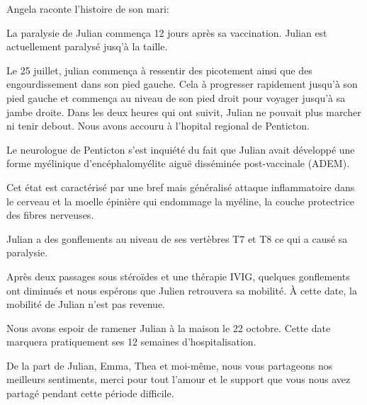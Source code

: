 Angela raconte l'histoire de son mari:

La paralysie de Julian commença 12 jours après sa vaccination. Julian est
actuellement paralysé jusq'à la taille.

Le 25 juillet, julian commença à ressentir des picotement ainsi que des
engourdissement dans son pied gauche. Cela à progresser rapidement jusqu'à son
pied gauche et commença au niveau de son pied droit pour voyager jusqu'à sa
jambe droite. Dans les deux heures qui ont suivit, Julian ne pouvait plus
marcher ni tenir debout. Nous avons accouru à l'hopital regional de Penticton.

Le neurologue de Penticton s'est inquiété du fait que Julian avait développé une
forme myélinique d'encéphalomyélite aiguë disséminée post-vaccinale (ADEM).

Cet état est caractérisé par une bref mais généralisé attaque inflammatoire dans
le cerveau et la moelle épinière qui endommage la myéline, la couche protectrice
des fibres nerveuses.

Julian a des gonflements au niveau de ses vertèbres T7 et T8 ce qui a causé sa
paralysie.

Après deux passages sous stéroïdes et une thérapie IVIG, quelques gonflements
ont diminués et nous espérons que Julien retrouvera sa mobilité. À cette date,
la mobilité de Julian n'est pas revenue.

Nous avons espoir de ramener Julian à la maison le 22 octobre. Cette date
marquera pratiquement ses 12 semaines d'hospitalisation.

De la part de Julian, Emma, Thea et moi-même, nous vous partageons nos meilleurs
sentiments, merci pour tout l'amour et le support que vous nous avez partagé
pendant cette période difficile.

